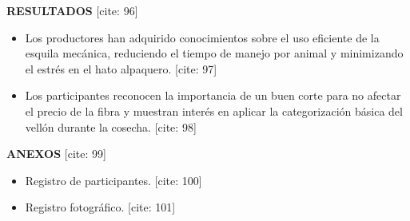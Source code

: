 \documentclass[11pt,a4paper]{article}
\begin{document}
\vspace{0.3cm}
\textbf{RESULTADOS} [cite: 96]
\begin{itemize}
    \item Los productores han adquirido conocimientos sobre el uso eficiente de la esquila mecánica, reduciendo el tiempo de manejo por animal y minimizando el estrés en el hato alpaquero. [cite: 97]
    \item Los participantes reconocen la importancia de un buen corte para no afectar el precio de la fibra y muestran interés en aplicar la categorización básica del vellón durante la cosecha. [cite: 98]
\end{itemize}

\textbf{ANEXOS} [cite: 99]
\begin{itemize}
    \item Registro de participantes. [cite: 100]
    \item Registro fotográfico. [cite: 101]
\end{itemize}
\end{document}
